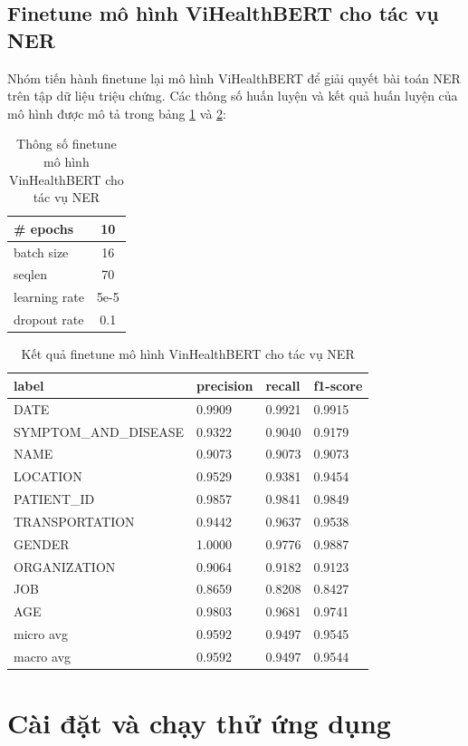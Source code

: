 \documentclass[12pt]{article}
\begin{document}
\subsection{Finetune mô hình ViHealthBERT cho tác vụ NER}
Nhóm tiến hành finetune lại mô hình ViHealthBERT để giải quyết bài toán NER trên tập dữ liệu triệu chứng. Các thông số huấn luyện và kết quả huấn luyện của mô hình được mô tả trong bảng \ref{tab:configurations} và \ref{tab:results}:
\begin{table}[H]
\centering
\begin{tabular}{|l|c|}
\hline
\# epochs & 10 \\
\hline
batch size & 16 \\
\hline
seqlen & 70 \\
\hline
learning rate & 5e-5 \\
\hline
dropout rate & 0.1 \\
\hline
\end{tabular}
\caption{Thông số finetune mô hình VinHealthBERT cho tác vụ NER}
\label{tab:configurations}
\end{table}
\begin{table}[H]
\centering
\begin{tabular}{|l|l|l|l|}
\hline
\textbf{label}        & \textbf{precision} & \textbf{recall} & \textbf{f1-score} \\ \hline
DATE                  & 0.9909             & 0.9921          & 0.9915            \\ \hline
SYMPTOM\_AND\_DISEASE & 0.9322             & 0.9040          & 0.9179            \\ \hline
NAME                  & 0.9073             & 0.9073          & 0.9073            \\ \hline
LOCATION              & 0.9529             & 0.9381          & 0.9454            \\ \hline
PATIENT\_ID           & 0.9857             & 0.9841          & 0.9849            \\ \hline
TRANSPORTATION        & 0.9442             & 0.9637          & 0.9538            \\ \hline
GENDER                & 1.0000             & 0.9776          & 0.9887            \\ \hline
ORGANIZATION          & 0.9064             & 0.9182          & 0.9123            \\ \hline
JOB                   & 0.8659             & 0.8208          & 0.8427            \\ \hline
AGE                   & 0.9803             & 0.9681          & 0.9741            \\ \hline
micro avg             & 0.9592             & 0.9497          & 0.9545            \\ \hline
macro avg             & 0.9592             & 0.9497          & 0.9544            \\ \hline
\end{tabular}
\caption{Kết quả finetune mô hình VinHealthBERT cho tác vụ NER}
\label{tab:results}
\end{table}

\section{Cài đặt và chạy thử ứng dụng}

\cleardoublepage
{}
{}


\end{document}
